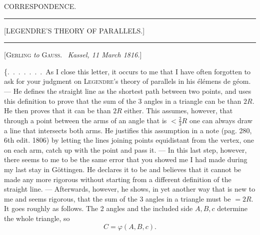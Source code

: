 \clearpage
{}\centerline{\Large CORRESPONDENCE.}

\bigskip
\hrule
\bigskip

\centerline{[LEGENDRE'S THEORY OF PARALLELS.]}

\bigskip
\hrule
\bigskip

\centerline{[\textsc{Gerling} \emph{to} \textsc{Gauss}. \ \emph{Kassel, 11 March 1816.}]}

\smallskip

\{.\ .\ .\ .\ .\ .\ .\ As I close this letter, it occurs to me that I have often forgotten to ask for your judgment on \textsc{Legendre}'s theory of parallels in his élémens de géom. --- He defines the straight line as the shortest path between two points, and uses this definition to prove that the sum of the 3 angles in a triangle can be  than $2R$. He then proves that it can be  than $2R$ either. This assumes, however, that through a point between the arms of an angle that is $< \tfrac{2}{3}R$ one can always draw a line that intersects both arms. He justifies this assumption in a note (pag. 280, 6th edit. 1806) by letting the lines joining points equidistant from the vertex, one on each arm, catch up with the point and pass it. --- In this last step, however, there seems to me to be the same
error that you showed me I had made during my last stay in Göttingen. He declares it to be  and believes that it cannot be made any more rigorous without starting from a different definition of the straight line. --- Afterwards, however, he shows, in yet another way that is new to me and seems rigorous, that the sum of the 3 angles in a triangle must be $= 2R$. It goes roughly as follows. The 2 angles and the included side $A, B, c$ determine the whole triangle, so
\[
C = \varphi(A,B,c).
\]
